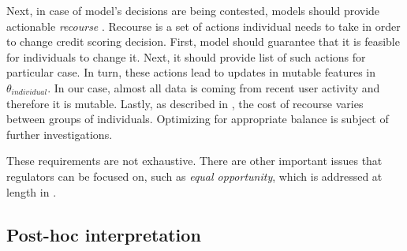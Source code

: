 \documentclass{article}
\begin{document}
Next, in case of model's decisions are being contested, models should provide actionable \textit{recourse} \cite{credit-recourse}. Recourse is a set of actions individual needs to take in order to change credit scoring decision. First, model should guarantee that it is feasible for individuals to change it. Next, it should provide list of such actions for particular case. In turn, these actions lead to updates in mutable features in $\theta_{individual}$. In our case, almost all data is coming from recent user activity and therefore it is mutable. Lastly, as described in \cite{credit-recourse}, the cost of recourse varies between groups of individuals. Optimizing for appropriate balance is subject of further investigations.

These requirements are not exhaustive. There are other important issues that regulators can be focused on, such as \textit{equal opportunity}, which is addressed at length in \cite{credit-fairness}.

\subsection{Post-hoc interpretation}
\end{document}
